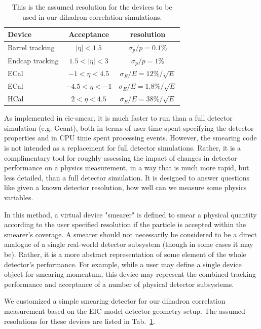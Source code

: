 \begin{table} 
\centering 
\caption[Assumed resolutions for fast smearing setup]{This is the
assumed resolution for the devices to be used in our dihadron correlation simulations.}
\label{tab:EIC_smear} 
\begin{tabular}{| l | c | c | } \hline
Device	& Acceptance & resolution \\ \hline
Barrel tracking  	&  $|\eta|<1.5$  &  $\sigma_{p}/p=0.1\%$   \\  
Endcap tracking    &  $1.5<|\eta|<3$  &   $\sigma_{p}/p=1\%$   \\  
ECal   & $-1<\eta<4.5$  &  $\sigma_{E}/E=12\%/\sqrt{E}$   \\  
ECal  & $-4.5<\eta<-1$ & $\sigma_{E}/E=1.8\%/\sqrt{E}$   \\ 
HCal  & $2<\eta<4.5$ & $\sigma_{E}/E=38\%/\sqrt{E}$   \\ \hline
\end{tabular} 
\end{table}


As implemented in eic-smear, it is much faster to run than a full detector
simulation (e.g. Geant), both in terms of user time spent specifying the
detector properties and in CPU time spent processing events. However,  the
smearing code is not intended as a replacement for full detector simulations.
Rather, it is a complimentary tool for roughly assessing the impact of changes
in detector performance on a physics measurement, in a way that is much more
rapid, but less detailed, than a full detector simulation. It is designed to
answer questions like given a known detector resolution, how well can we
measure some physics variables. 

In this method, a virtual device "smearer" is defined to smear a physical
quantity according to the user specified resolution if the particle is accepted
within the smearer's coverage. A smearer should not necessarily be considered to
be a direct analogue of a single real-world detector subsystem (though in some
cases it may be). Rather, it is a more abstract representation of some element
of the whole detector's performance. For example, while a user may define a
single device object for smearing momentum, this device may represent the
combined tracking performance and acceptance of a number of physical detector
subsystems.

We customized a simple smearing detector for our dihadron correlation
measurement based on the EIC model detector geometry setup. The assumed
resolutions for these devices are listed in Tab.~\ref{tab:EIC_smear}.





